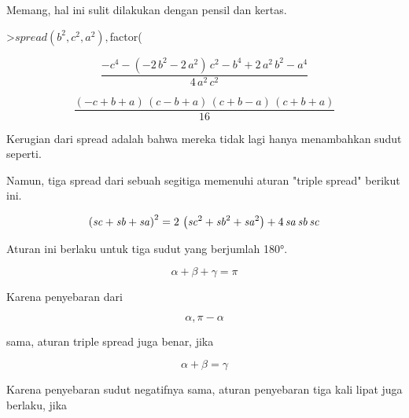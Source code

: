 \documentclass[12pt,Times new roman,letterpaper]{book}
\begin{document}
\begin{eulernootebook}
\begin{eulercomment}
\begin{eulercomment}
\begin{eulernootebook}
\begin{eulercomment}
\begin{eulercomment}
\begin{eulercomment}
\begin{eulercomment}
\begin{eulercomment}
\begin{eulercomment}
\begin{eulernotebook}
\begin{eulercomment}
\begin{eulercomment}
\begin{eulercomment}
\begin{eulercomment}
Memang, hal ini sulit dilakukan dengan pensil dan kertas.
\end{eulercomment}
\begin{eulerprompt}
>$spread(b^2,c^2,a^2), $factor(%
\end{eulerprompt}
\begin{eulerformula}
\[
\frac{-c^4-\left(-2\,b^2-2\,a^2\right)\,c^2-b^4+2\,a^2\,b^2-a^4}{4
 \,a^2\,c^2}
\]
\end{eulerformula}
\begin{eulerformula}
\[
\frac{\left(-c+b+a\right)\,\left(c-b+a\right)\,\left(c+b-a\right)\,
 \left(c+b+a\right)}{16}
\]
\end{eulerformula}
\begin{eulercomment}
Kerugian dari spread adalah bahwa mereka tidak lagi hanya menambahkan
sudut seperti.

Namun, tiga spread dari sebuah segitiga memenuhi aturan "triple
spread" berikut ini.
\end{eulercomment}
\begin{eulerformula}
\[
\left({\it sc}+{\it sb}+{\it sa}\right)^2=2\,\left({\it sc}^2+
 {\it sb}^2+{\it sa}^2\right)+4\,{\it sa}\,{\it sb}\,{\it sc}
\]
\end{eulerformula}
\begin{eulercomment}
Aturan ini berlaku untuk tiga sudut yang berjumlah 180°.

\end{eulercomment}
\begin{eulerformula}
\[
\alpha+\beta+\gamma=\pi
\]
\end{eulerformula}
\begin{eulercomment}
Karena penyebaran dari

\end{eulercomment}
\begin{eulerformula}
\[
\alpha, \pi-\alpha
\]
\end{eulerformula}
\begin{eulercomment}
sama, aturan triple spread juga benar, jika

\end{eulercomment}
\begin{eulerformula}
\[
\alpha+\beta=\gamma
\]
\end{eulerformula}
\begin{eulercomment}
Karena penyebaran sudut negatifnya sama, aturan penyebaran tiga kali
lipat juga berlaku, jika


\end{eulercomment}
\end{eulercomment}
\end{eulercomment}
\end{eulercomment}
\end{eulernotebook}
\end{eulercomment}
\end{eulercomment}
\end{eulercomment}
\end{eulercomment}
\end{eulercomment}
\end{eulercomment}
\end{eulernootebook}
\end{eulercomment}
\end{eulercomment}
\end{eulernootebook}
\end{document}
